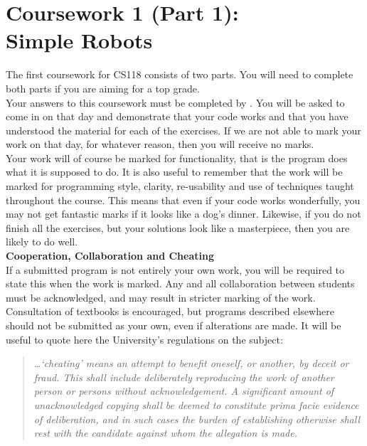 \clearpage 
\section{Coursework 1 (Part 1): \\ Simple Robots}

The first coursework for CS118 consists of two parts. You will need to 
complete both parts if you are aiming for a top grade. \\

Your answers to this coursework must be completed by \deadlineone. 
You will be asked to come in on that day and demonstrate 
that your code works and that you have understood the material for each of
the exercises. If we are not able to mark your work on that day, for whatever 
reason, then you will receive no marks.\\

Your work will of course be marked for functionality, that is the program does 
what it is supposed to do. It is also useful to remember that the work will 
be marked for programming style, clarity, re-usability and use of 
techniques taught throughout the course. This means that even if your code 
works wonderfully, you may not get fantastic marks if it looks like a 
dog's dinner. Likewise, if you do not finish all the exercises, but your
solutions look like a masterpiece, then you are likely to do well. \\

{\bf Cooperation, Collaboration and Cheating}\\

If a submitted program is not entirely your own work, you will be required
to state this when the work is marked. Any and all 
collaboration between students
must be acknowledged, and may result in stricter marking of the work.
Consultation of textbooks is encouraged, but programs described elsewhere
should not be submitted as your own, even if alterations are made.
It will be useful to quote here the University's regulations on the subject:

\begin{quote}
{\em \ldots `cheating' means an attempt to benefit oneself, or another, by
deceit or fraud. This shall include deliberately reproducing the work of
another person or persons without acknowledgement. A significant amount of
unacknowledged copying shall be deemed to constitute prima facie evidence of
deliberation, and in such cases the burden of establishing otherwise shall
rest with the candidate against whom the allegation is made.}
\end{quote}

